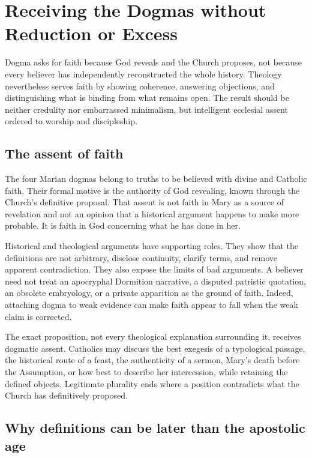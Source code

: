 \section{Receiving the Dogmas without Reduction or Excess}

Dogma asks for faith because God reveals and the Church proposes, not because every believer has independently reconstructed the whole history. Theology nevertheless serves faith by showing coherence, answering objections, and distinguishing what is binding from what remains open. The result should be neither credulity nor embarrassed minimalism, but intelligent ecclesial assent ordered to worship and discipleship.

\subsection{The assent of faith}

The four Marian dogmas belong to truths to be believed with divine and Catholic faith. Their formal motive is the authority of God revealing, known through the Church's definitive proposal. That assent is not faith in Mary as a source of revelation and not an opinion that a historical argument happens to make more probable. It is faith in God concerning what he has done in her.

Historical and theological arguments have supporting roles. They show that the definitions are not arbitrary, disclose continuity, clarify terms, and remove apparent contradiction. They also expose the limits of bad arguments. A believer need not treat an apocryphal Dormition narrative, a disputed patristic quotation, an obsolete embryology, or a private apparition as the ground of faith. Indeed, attaching dogma to weak evidence can make faith appear to fall when the weak claim is corrected.

The exact proposition, not every theological explanation surrounding it, receives dogmatic assent. Catholics may discuss the best exegesis of a typological passage, the historical route of a feast, the authenticity of a sermon, Mary's death before the Assumption, or how best to describe her intercession, while retaining the defined objects. Legitimate plurality ends where a position contradicts what the Church has definitively proposed.

\subsection{Why definitions can be later than the apostolic age}

